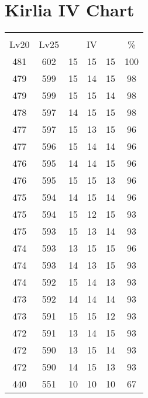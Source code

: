 \documentclass{article}%
\begin{document}
%
\normalsize%
\section{Kirlia IV Chart}%
\label{sec:Kirlia IV Chart}%
\renewcommand{\arraystretch}{1.5}%
\begin{tabular}{|c|c|c|c|c|c|}%
\hline%
\multicolumn{6}{|c|}{\textcolor{white}{ 
\linebreak{Kirlia}
}%
\cellcolor{black}}\\%
\multicolumn{1}{|c}{Lv20}&\multicolumn{1}{c|}{Lv25}&\multicolumn{3}{c|}{IV}&\multicolumn{1}{|c|}{\%}\\%
\hline%
\rowcolor{color100}%
481&602&15&15&15&100\\%
\hline%
\rowcolor{color98}%
479&599&15&14&15&98\\%
\hline%
\rowcolor{color98}%
479&599&15&15&14&98\\%
\hline%
\rowcolor{color98}%
478&597&14&15&15&98\\%
\hline%
\rowcolor{color96}%
477&597&15&13&15&96\\%
\hline%
\rowcolor{color96}%
477&596&15&14&14&96\\%
\hline%
\rowcolor{color96}%
476&595&14&14&15&96\\%
\hline%
\rowcolor{color96}%
476&595&15&15&13&96\\%
\hline%
\rowcolor{color96}%
475&594&14&15&14&96\\%
\hline%
\rowcolor{color93}%
475&594&15&12&15&93\\%
\hline%
\rowcolor{color93}%
475&593&15&13&14&93\\%
\hline%
\rowcolor{color96}%
474&593&13&15&15&96\\%
\hline%
\rowcolor{color93}%
474&593&14&13&15&93\\%
\hline%
\rowcolor{color93}%
474&592&15&14&13&93\\%
\hline%
\rowcolor{color93}%
473&592&14&14&14&93\\%
\hline%
\rowcolor{color93}%
473&591&15&15&12&93\\%
\hline%
\rowcolor{color93}%
472&591&13&14&15&93\\%
\hline%
\rowcolor{color93}%
472&590&13&15&14&93\\%
\hline%
\rowcolor{color93}%
472&590&14&15&13&93\\%
\hline%
\rowcolor{color91}%
440&551&10&10&10&67\\%
\end{tabular}

%
\end{document}
